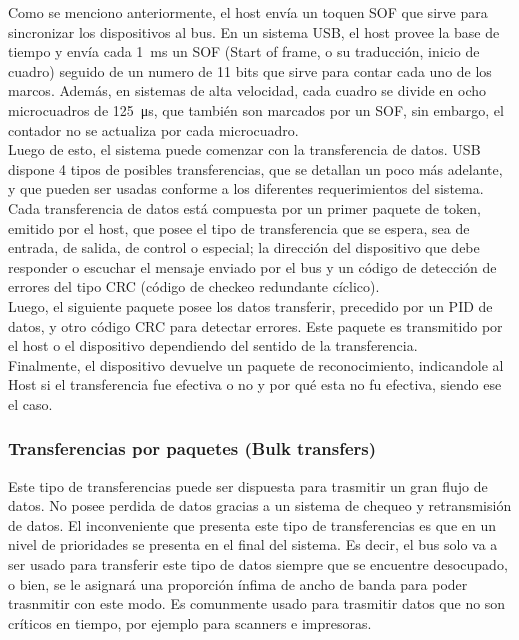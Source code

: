 	Como se menciono anteriormente, el host envía un toquen SOF que sirve para sincronizar los dispositivos al bus. En un sistema USB, el host provee la base de tiempo y envía cada \SI{1}{\milli\second} un SOF (Start of frame, o su traducción, inicio de cuadro) seguido de un numero de 11 bits que sirve para contar cada uno de los marcos. Además, en sistemas de alta velocidad, cada cuadro se divide en ocho microcuadros de \SI{125}{\micro\second}, que también son marcados por un SOF, sin embargo, el contador no se actualiza por cada microcuadro.\\
	
	Luego de esto, el sistema puede comenzar con la transferencia de datos. USB dispone 4 tipos de posibles transferencias, que se detallan un poco más adelante, y que pueden ser usadas conforme a los diferentes requerimientos del sistema.\\
	
	Cada transferencia de datos está compuesta por un primer paquete de token, emitido por el host, que posee el tipo de transferencia que se espera, sea de entrada, de salida, de control o especial; la dirección del dispositivo que debe responder o escuchar el mensaje enviado por el bus y un código de detección de errores del tipo CRC (código de checkeo redundante cíclico).\\
	
	Luego, el siguiente paquete posee los datos transferir, precedido por un PID de datos, y otro código CRC para detectar errores. Este paquete es transmitido por el host o el dispositivo dependiendo del sentido de la transferencia.\\
	
	Finalmente, el dispositivo devuelve un paquete de reconocimiento, indicandole al Host si el transferencia fue efectiva o no y por qué esta no fu efectiva, siendo ese el caso.\\
	
	\subsubsection*{Transferencias por paquetes (Bulk transfers)}
		Este tipo de transferencias puede ser dispuesta para trasmitir un gran flujo de datos. No posee perdida de datos gracias a un sistema de chequeo y retransmisión de datos. El inconveniente que presenta este tipo de transferencias es que en un nivel de prioridades se presenta en el final del sistema. Es decir, el bus solo va a ser usado para transferir este tipo de datos siempre que se encuentre desocupado, o bien, se le asignará una proporción ínfima de ancho de banda para poder trasnmitir con este modo. Es comunmente usado para trasmitir datos que no son críticos en tiempo, por ejemplo para scanners e impresoras.\\
	
